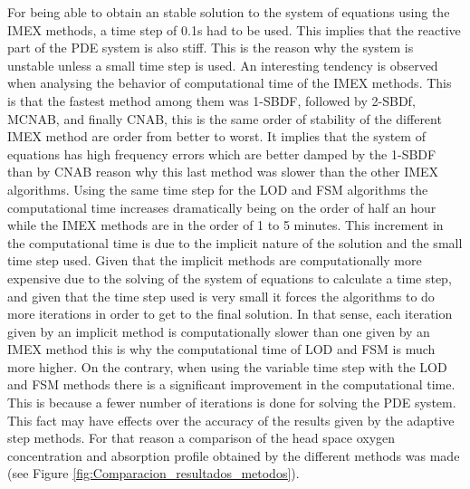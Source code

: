 For being able to obtain an stable solution to the system of equations using the IMEX methods, a time step of 0.1s had to be used. This implies that the reactive part of the PDE system is also stiff. This is the reason why the system is unstable unless a small time step is used. An interesting tendency is observed when analysing the  behavior of computational time of the IMEX methods. This is that the fastest method among them was 1-SBDF, followed by 2-SBDf, MCNAB, and finally CNAB, this is the same order of stability of the different IMEX method are order from better to worst. It implies that the system of equations has high frequency errors which are better damped by the 1-SBDF than by CNAB reason why this last method was slower than the other IMEX algorithms. Using the same time step for the LOD and FSM algorithms the computational time increases dramatically being on the order of half an hour while the IMEX methods are in the order of 1 to 5 minutes. This increment in the computational time is due to the implicit nature of the solution and the small time step used. Given that the implicit methods are computationally more expensive due to the solving of the system of equations to calculate a time step, and given that the time step used is very small it forces the algorithms to do more iterations in order to get to the final solution. In that sense, each iteration given by an implicit method is computationally slower than one given by an IMEX method this is why the computational time of LOD and FSM is much more higher. On the contrary, when using the variable time step with the LOD and FSM methods there is a significant improvement in the computational time. This is because a fewer number of iterations is done  for solving the PDE system. This fact may have effects over the accuracy of the results given by the adaptive step methods. For that reason a comparison of the head space oxygen concentration and absorption profile obtained by the different methods was made (see Figure \ref{fig:Comparacion_resultados_metodos}).

